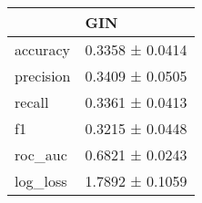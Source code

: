 \begin{tabular}{ll}
\toprule
 & GIN \\
\midrule
accuracy & 0.3358 ± 0.0414 \\
precision & 0.3409 ± 0.0505 \\
recall & 0.3361 ± 0.0413 \\
f1 & 0.3215 ± 0.0448 \\
roc_auc & 0.6821 ± 0.0243 \\
log_loss & 1.7892 ± 0.1059 \\
\bottomrule
\end{tabular}
